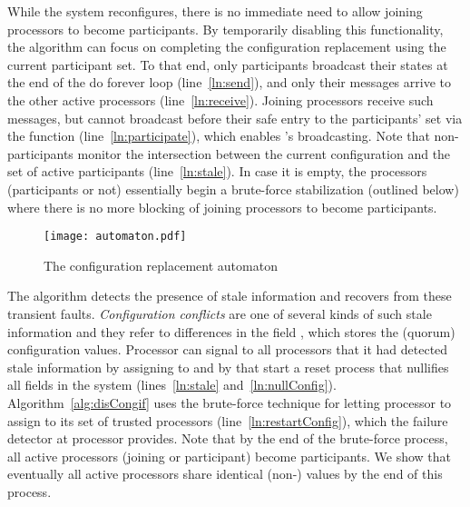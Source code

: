 \documentclass[11pt]{article}
\begin{document}
While the system reconfigures, there is no immediate need to allow joining processors to become participants. By temporarily disabling this functionality, the algorithm can focus on completing the configuration replacement using the current participant set. To that end, 
only participants broadcast their states at the end of the do forever loop (line~\ref{ln:send}), and only their messages arrive to the other active processors (line~\ref{ln:receive}). Joining processors receive such messages, but cannot broadcast before their safe entry to the participants' set via the function  (line~\ref{ln:participate}), which enables 's broadcasting. 
Note that non-participants monitor the intersection between the current configuration and the set of active participants (line~\ref{ln:stale}). In case it is empty, the processors (participants or not) essentially begin a brute-force stabilization (outlined below) where there is no more blocking of joining processors to become participants.









\begin{figure*}[t!] 
\center
	\texttt{[image: automaton.pdf]}
	\caption{The configuration replacement automaton}
	\label{fig:auto}
\end{figure*} 


The algorithm detects the presence of stale information and recovers from these transient faults. {\em Configuration conflicts} are one of several kinds of such stale information and they refer to differences in the field , which stores the (quorum) configuration values. Processor  can signal to all processors that it had detected stale information by assigning  to  and by that start a reset process that nullifies all  fields in the system (lines~\ref{ln:stale} and~\ref{ln:nullConfig}). 
Algorithm~\ref{alg:disCongif} uses the brute-force technique for letting processor  to assign to  its set of trusted processors (line~\ref{ln:restartConfig}), which the failure detector  at processor  provides. Note that by the end of the brute-force process, all active processors (joining or participant) become  participants. We show that 
eventually all active processors share identical (non-)  values by the end of this process.
\end{document}
